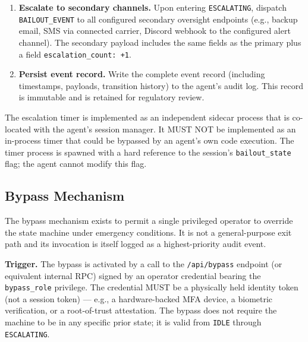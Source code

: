 \begin{algorithm}
\begin{enumerate}
  \item \textbf{Escalate to secondary channels.} Upon entering \texttt{ESCALATING}, dispatch \texttt{BAILOUT\_EVENT} to all configured secondary oversight endpoints (e.g., backup email, SMS via connected carrier, Discord webhook to the configured alert channel). The secondary payload includes the same fields as the primary plus a field \texttt{escalation\_count: +1}.

  \item \textbf{Persist event record.} Write the complete event record (including timestamps, payloads, transition history) to the agent's audit log. This record is immutable and is retained for regulatory review.
\end{enumerate}
\end{algorithm}

\bigskip

The escalation timer is implemented as an independent sidecar process that is co-located with the agent's session manager. It MUST NOT be implemented as an in-process timer that could be bypassed by an agent's own code execution. The timer process is spawned with a hard reference to the session's \texttt{bailout\_state} flag; the agent cannot modify this flag.

\bigskip

\subsection{Bypass Mechanism}

The bypass mechanism exists to permit a single privileged operator to override the state machine under emergency conditions. It is not a general-purpose exit path and its invocation is itself logged as a highest-priority audit event.

\bigskip

\noindent\textbf{Trigger.} The bypass is activated by a call to the \texttt{/api/bypass} endpoint (or equivalent internal RPC) signed by an operator credential bearing the \texttt{bypass\_role} privilege. The credential MUST be a physically held identity token (not a session token) — e.g., a hardware-backed MFA device, a biometric verification, or a root-of-trust attestation. The bypass does not require the machine to be in any specific prior state; it is valid from \texttt{IDLE} through \texttt{ESCALATING}.

\bigskip

